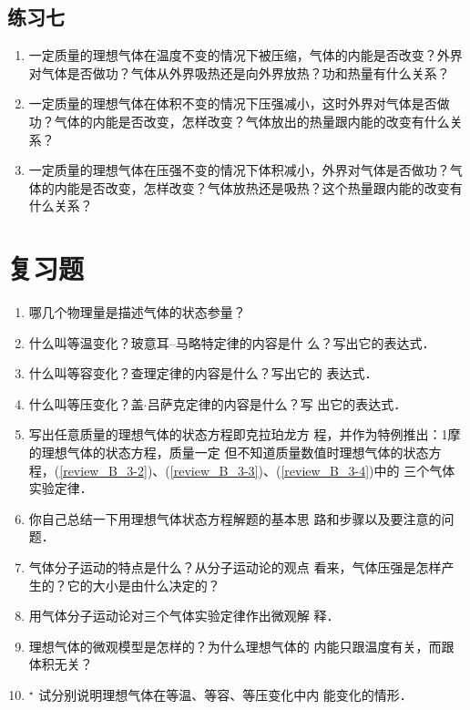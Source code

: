 \subsection*{练习七}
\begin{enumerate}
    \item 一定质量的理想气体在温度不变的情况下被压缩，气体的内能是否改变？外界对气体是否做功？气体从外界吸热还是向外界放热？功和热量有什么关系？
\item 一定质量的理想气体在体积不变的情况下压强减小，这时外界对气体是否做功？气体的内能是否改变，怎样改变？气体放出的热量跟内能的改变有什么关系？
\item 一定质量的理想气体在压强不变的情况下体积减小，外界对气体是否做功？气体的内能是否改变，怎样改变？气体放热还是吸热？这个热量跟内能的改变有什么关系？
\end{enumerate}



\section*{复习题}

\begin{enumerate}
	\item 
	哪几个物理量是描述气体的状态参量？
	
	\item \label{review_B_3-2}
	什么叫等温变化？玻意耳--马略特定律的内容是什
	么？写出它的表达式．
	
	\item \label{review_B_3-3}
	什么叫等容变化？查理定律的内容是什么？写出它的
	表达式．
	
	\item \label{review_B_3-4}
	什么叫等压变化？盖$\cdot$吕萨克定律的内容是什么？写
	出它的表达式．
	
	\item 
	写出任意质量的理想气体的状态方程即克拉珀龙方
	程，并作为特例推出：1摩的理想气体的状态方程，质量一定
	但不知道质量数值时理想气体的状态方程，(\ref{review_B_3-2})、(\ref{review_B_3-3})、(\ref{review_B_3-4})中的
	三个气体实验定律．
	
	
	
	\item 
	你自己总结一下用理想气体状态方程解题的基本思
	路和步骤以及要注意的问题．
	
	\item 
	气体分子运动的特点是什么？从分子运动论的观点
	看来，气体压强是怎样产生的？它的大小是由什么决定的？
	
	\item 
	用气体分子运动论对三个气体实验定律作出微观解
	释．
	
	\item 
	理想气体的微观模型是怎样的？为什么理想气体的
	内能只跟温度有关，而跟体积无关？
	
	\item$^\star$ 
	试分别说明理想气体在等温、等容、等压变化中内
	能变化的情形．
	
\end{enumerate}


